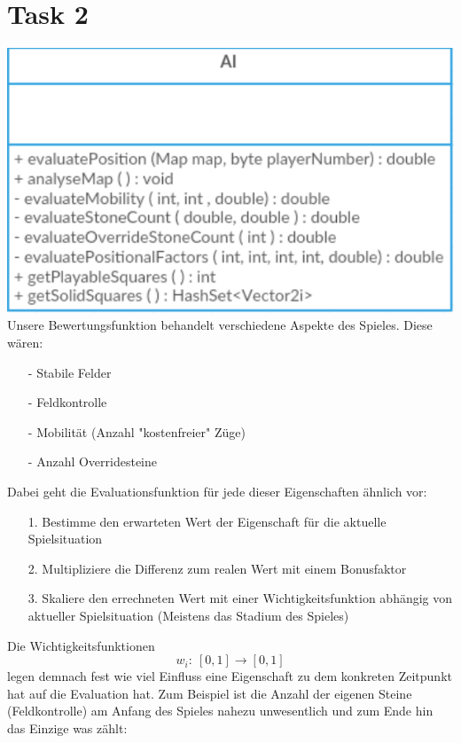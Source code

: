\section{Task 2}
\includegraphics[scale=0.5]{AIClassdiagram.pdf}
Unsere Bewertungsfunktion behandelt verschiedene Aspekte des Spieles. Diese wären:
\begin{enumerate}
\item[-] Stabile Felder
\item[-] Feldkontrolle
\item[-] Mobilität (Anzahl "kostenfreier" Züge)
\item[-] Anzahl Overridesteine
\end{enumerate}
Dabei geht die Evaluationsfunktion für jede dieser Eigenschaften ähnlich vor: 
\begin{enumerate}
\item[1.] Bestimme den erwarteten Wert der Eigenschaft für die aktuelle Spielsituation
\item[2.] Multipliziere die Differenz zum realen Wert mit einem Bonusfaktor
\item[3.] Skaliere den errechneten Wert mit einer Wichtigkeitsfunktion abhängig von aktueller Spielsituation (Meistens das Stadium des Spieles)
\end{enumerate}
Die Wichtigkeitsfunktionen $$w_i:\ [0,1] \rightarrow [0,1]$$ legen demnach fest wie viel Einfluss eine Eigenschaft zu dem konkreten Zeitpunkt hat auf die Evaluation hat. Zum Beispiel ist die Anzahl der eigenen Steine (Feldkontrolle) am Anfang des Spieles nahezu unwesentlich und zum Ende hin das Einzige was zählt:
